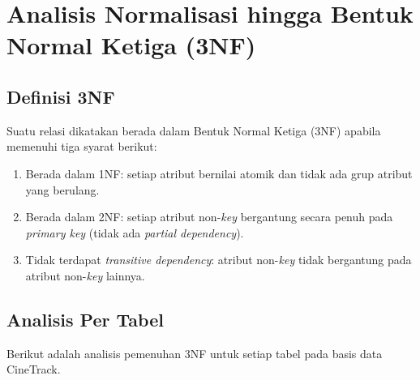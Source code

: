 \documentclass[letter,12pt,bahasa]{article}
\begin{document}
\section{Analisis Normalisasi hingga Bentuk Normal Ketiga (3NF)}

\subsection{Definisi 3NF}

Suatu relasi dikatakan berada dalam Bentuk Normal Ketiga (3NF) apabila memenuhi tiga syarat berikut:
\begin{enumerate}
    \item Berada dalam 1NF: setiap atribut bernilai atomik dan tidak ada grup atribut yang berulang.
    \item Berada dalam 2NF: setiap atribut non-\textit{key} bergantung secara penuh pada \textit{primary key} (tidak ada \textit{partial dependency}).
    \item Tidak terdapat \textit{transitive dependency}: atribut non-\textit{key} tidak bergantung pada atribut non-\textit{key} lainnya.
\end{enumerate}

\subsection{Analisis Per Tabel}

Berikut adalah analisis pemenuhan 3NF untuk setiap tabel pada basis data CineTrack.
\end{document}
